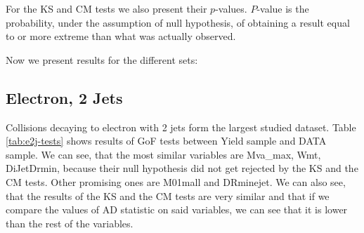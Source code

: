 For the KS and CM tests we also present their $p$-values. $P$-value is the probability, under the assumption of null hypothesis, of obtaining a result equal to or more extreme than what was actually observed. 

Now we present results for the different sets:

\subsection{Electron, 2 Jets}

\noindent Collisions decaying to electron with 2 jets form the largest studied dataset. Table \ref{tab:e2j-tests} shows results of GoF tests between Yield sample and DATA sample. We can see, that the most similar variables are \textsf{Mva\_max, Wmt, DiJetDrmin}, because their null hypothesis did not   get rejected by the KS and the CM tests. Other promising ones are \textsf{M01mall and DRminejet}. We can also see, that the results of the KS and the CM tests are very similar and that if we compare the values of AD statistic on said variables, we can see that it is lower than the rest of the  variables. 


